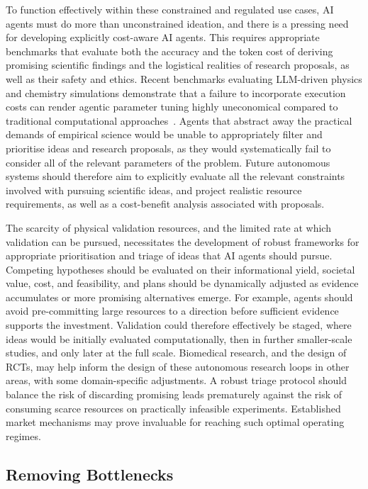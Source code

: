 \documentclass[11pt, a4paper, twocolumn, goog]{google}
\begin{document}
To function effectively within these constrained and regulated use cases, AI agents must do more than unconstrained ideation, and there is a pressing need for developing explicitly cost-aware AI agents. This requires appropriate benchmarks that evaluate both the accuracy and the token cost of deriving promising scientific findings and the logistical realities of research proposals, as well as their safety and ethics. Recent benchmarks evaluating LLM-driven physics and chemistry simulations demonstrate that a failure to incorporate execution costs can render agentic parameter tuning highly uneconomical compared to traditional computational approaches~\citep{cao2026simulcost}. Agents that abstract away the practical demands of empirical science would be unable to appropriately filter and prioritise ideas and research proposals, as they would systematically fail to consider all of the relevant parameters of the problem. Future autonomous systems should therefore aim to explicitly evaluate all the relevant constraints involved with pursuing scientific ideas, and project realistic resource requirements, as well as a cost-benefit analysis associated with proposals.

The scarcity of physical validation resources, and the limited rate at which validation can be pursued, necessitates the development of robust frameworks for appropriate prioritisation and triage of ideas that AI agents should pursue. Competing hypotheses should be evaluated on their informational yield, societal value, cost, and feasibility, and plans should be dynamically adjusted as evidence accumulates or more promising alternatives emerge. For example, agents should avoid pre-committing large resources to a direction before sufficient evidence supports the investment. Validation could therefore effectively be staged, where ideas would be initially evaluated computationally, then in further smaller-scale studies, and only later at the full scale. Biomedical research, and the design of RCTs, may help inform the design of these autonomous research loops in other areas, with some domain-specific adjustments. A robust triage protocol should balance the risk of discarding promising leads prematurely against the risk of consuming scarce resources on practically infeasible experiments. Established market mechanisms may prove invaluable for reaching such optimal operating regimes.

\subsection{Removing Bottlenecks}
\end{document}
